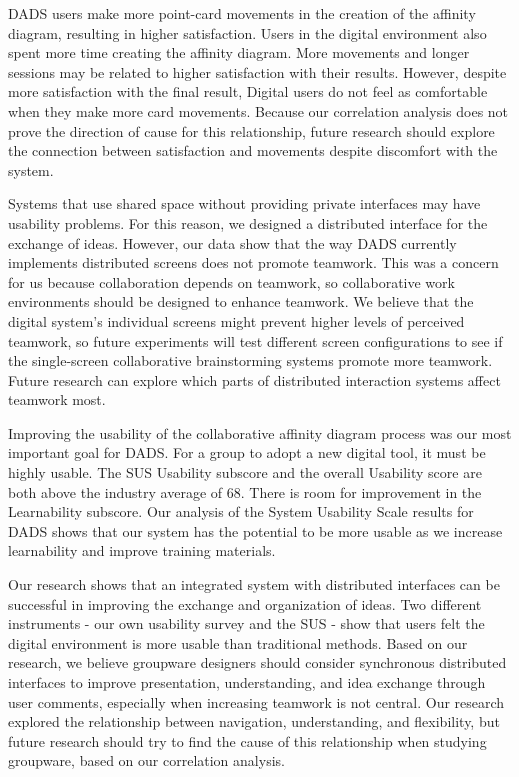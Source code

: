 DADS users make more point-card movements in the creation of the affinity diagram, resulting in higher satisfaction. Users in the digital environment also spent more time creating the affinity diagram. More movements and longer sessions may be related to higher satisfaction with their results. However, despite more satisfaction with the final result, Digital users do not feel as comfortable when they make more card movements. Because our correlation analysis does not prove the direction of cause for this relationship, future research should explore the connection between satisfaction and movements despite discomfort with the system.

Systems that use shared space without providing private interfaces may have usability problems. For this reason, we designed a distributed interface for the exchange of ideas. However, our data show that the way DADS currently implements distributed screens does not promote teamwork. This was a concern for us because collaboration depends on teamwork, so collaborative work environments should be designed to enhance teamwork. We believe that the digital system's individual screens might prevent higher levels of perceived teamwork, so future experiments will test different screen configurations to see if the single-screen collaborative brainstorming systems promote more teamwork. Future research can explore which parts of distributed interaction systems affect teamwork most.

Improving the usability of the collaborative affinity diagram process was our most important goal for DADS. For a group to adopt a new digital tool, it must be highly usable. The SUS Usability subscore and the overall Usability score are both above the industry average of 68. There is room for improvement in the Learnability subscore. Our analysis of the System Usability Scale results for DADS shows that our system has the potential to be more usable as we increase learnability and improve training materials. 

Our research shows that an integrated system with distributed interfaces can be successful in improving the exchange and organization of ideas. Two different instruments - our own usability survey and the SUS - show that users felt the digital environment is more usable than traditional methods. Based on our research, we believe groupware designers should consider synchronous distributed interfaces to improve presentation, understanding, and idea exchange through user comments, especially when increasing teamwork is not central. Our research explored the relationship between navigation, understanding, and flexibility, but future research should try to find the cause of this relationship when studying groupware, based on our correlation analysis. 

